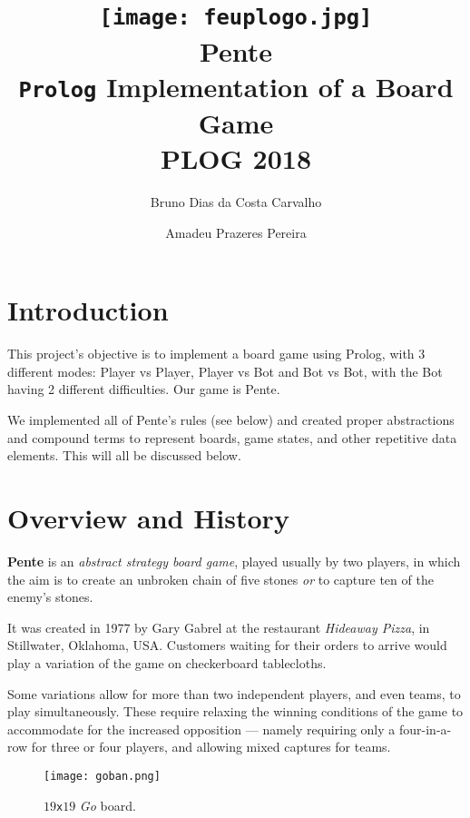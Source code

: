 \documentclass[12pt,a4paper,notitlepage]{article}
\title{
	\vspace{-2\baselineskip}
	\texttt{[image: feuplogo.jpg]}\\
	{\Huge Pente}\\
	{\Large \texttt{Prolog} Implementation of a Board Game}\\
	{\normalsize PLOG 2018}
}
\author{
	Bruno Dias da Costa Carvalho\hspace*{1.5em}\text{up201606517}
	\and
	Amadeu Prazeres Pereira\hspace*{1.5em}\text{up201605646} 
}
\newcommand*{\boardsize}[1]{$#1$\texttt{x}$#1$}
\begin{document}
\maketitle
\thispagestyle{empty}
\vspace*{-2\baselineskip}
\tableofcontents

\section{Introduction}
\label{sec:introduction}

This project's objective is to implement a board game using Prolog, with 3 different modes: Player vs Player, Player vs Bot and Bot vs Bot, with the Bot having 2 different difficulties. Our game is Pente.

We implemented all of Pente's rules (see below) and created proper abstractions and compound terms to represent boards, game states, and other repetitive data elements.
This will all be discussed below.

\section{Overview and History}
\label{sec:overview}

\textbf{Pente} is an \textit{abstract strategy board game}, played usually by two players, in which the aim is to create an unbroken chain of five stones \emph{or} to capture ten of the enemy's stones.

It was created in 1977 by Gary Gabrel at the restaurant \textsl{Hideaway Pizza}, in Stillwater, Oklahoma, USA.\supercite{pente-wikipedia}
Customers waiting for their orders to arrive would play a variation of the game on checkerboard tablecloths.\supercite{pente-wikipedia}

Some variations allow for more than two independent players, and even teams, to play simultaneously. These require relaxing the winning conditions of the game to accommodate for the increased opposition --- namely requiring only a four-in-a-row for three or four players, and allowing mixed captures for teams.\supercite{pente-winning-moves}

\begin{wrapfigure}[12]{l}[2em]{0.33\textwidth}
	\vspace*{-1\baselineskip}
	\texttt{[image: goban.png]}
	\caption{\boardsize{19} \textit{Go} board. \label{fig:goban}}
\end{wrapfigure}
\end{document}

